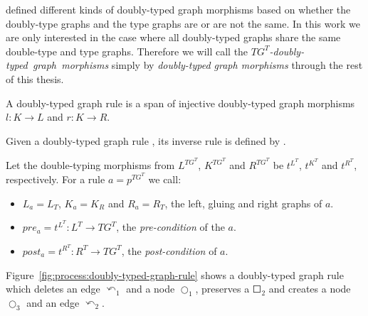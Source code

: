 \begin{remark} \cite{Ribeiro1996} defined different kinds of doubly-typed graph morphisms based on whether the doubly-type graphs and the type graphs are or are not the same. In this work we are only interested in the case where all doubly-typed graphs share the same double-type and type graphs. Therefore we will call the \mbox{\emph{$TG^T$-doubly-typed graph morphisms}} simply by \emph{doubly-typed graph morphisms} through the rest of this thesis.
\end{remark}


\begin{definition} A doubly-typed graph rule \doublyTypedRule{} is a span of injective doubly-typed graph morphisms $l : K \rightarrow L$ and $r : K \rightarrow R$.


  Given a doubly-typed graph rule \doublyTypedRule{}, its inverse rule is defined by \inverseDoublyTypedRule{}.

  Let the double-typing morphisms from $L^{TG^T}$, $K^{TG^T}$ and $R^{TG^T}$ be $t^{L^T}$, $t^{K^T}$ and $t^{R^T}$, respectively. For a rule $a = p^{TG^T}$ we call:

  \begin{itemize}
    \item $L_a = L_T$, $K_a = K_R$ and $R_a = R_T$, the left, gluing and right graphs of $a$.
    \item $pre_a = t^{L^T} : L^T \rightarrow TG^T$, the \emph{pre-condition} of the $a$.
    \item $post_a = t^{R^T} : R^T \rightarrow TG^T$, the \emph{post-condition} of $a$.
  \end{itemize}
\end{definition}

\begin{example}Figure~\ref{fig:process:doubly-typed-graph-rule} shows a doubly-typed graph rule which deletes an edge $\curvearrowleft_1$ and a node $\Circle_1$, preserves a $\Square_2$ and creates a node $\Circle_3$ and an edge $\curvearrowleft_2$.
\end{example}

